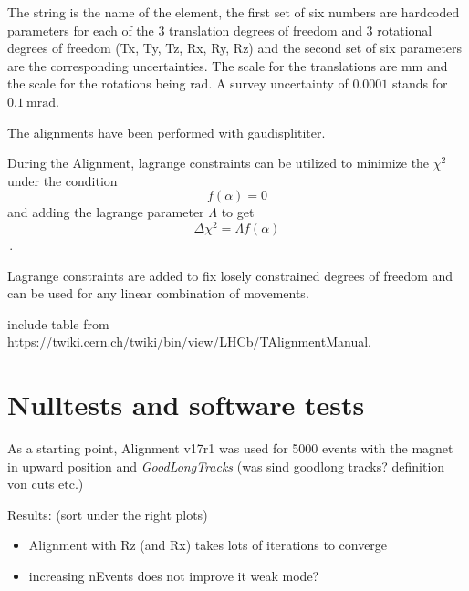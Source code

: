 The string is the name of the element, the first set of six numbers are hardcoded parameters for each of the 3 translation degrees of freedom and 3 rotational degrees of freedom (Tx, Ty, Tz, Rx, Ry, Rz) and the second set of six parameters are the corresponding uncertainties.
The scale for the translations are $\si{\milli\metre}$ and the scale for the rotations being $\si{\radian}$. A survey uncertainty of $\num{0.0001}$ stands for $\SI{0.1}{\milli\radian}$.

The alignments have been performed with gaudisplititer.

During the Alignment, lagrange constraints can be utilized to minimize the
$\chi^2$ under the condition
\begin{equation}
  f(\alpha) = 0
\end{equation}
and adding the lagrange parameter $\Lambda$ to get
\begin{equation}
  \Delta \chi^2 = \Lambda f(\alpha)
\end{equation}\,.

Lagrange constraints are added to fix losely constrained degrees of freedom and can be used for any linear combination of movements.

include table from https://twiki.cern.ch/twiki/bin/view/LHCb/TAlignmentManual.

\section{Nulltests and software tests}

As a starting point, Alignment v17r1 was used for 5000 events with the magnet in upward position and \textit{GoodLongTracks} (was sind goodlong tracks? definition von cuts etc.)

Results: (sort under the right plots) \\
\begin{itemize}
  \item Alignment with Rz (and Rx) takes lots of iterations to converge
  \item increasing nEvents does not improve it \to weak mode?
\end{itemize}

